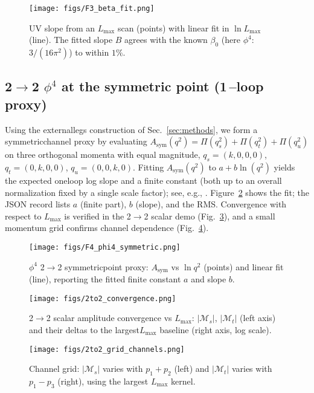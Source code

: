 \documentclass[11pt,a4paper]{article}
\theoremstyle{definition}
\theoremstyle{remark}
\begin{document}
\begin{figure}[ht]
  \centering
  \texttt{[image: figs/F3\_beta\_fit.png]}
  \caption{UV slope from an $L_{\max}$ scan (points) with linear fit in $\ln L_{\max}$ (line). The fitted slope $B$ agrees with the known $\beta_0$ (here $\phi^{4}$: $3/(16\pi^2)$) to within $1\%$.}
  \label{fig:F3}
\end{figure}

\subsection{2$\to$2 $\phi^4$ at the symmetric point (1\mbox{\,--}loop proxy)}
Using the external\-legs construction of Sec.~\ref{sec:methods}, we form a symmetric\-channel proxy by evaluating
\(
  A_{\mathrm{sym}}(q^2)=\Pi(q_s^2)+\Pi(q_t^2)+\Pi(q_u^2)
\)
on three orthogonal momenta with equal magnitude, $q_s=(k,0,0,0)$, $q_t=(0,k,0,0)$, $q_u=(0,0,k,0)$. Fitting $A_{\mathrm{sym}}(q^2)$ to $a+b\ln(q^2)$ yields the expected one\-loop log slope and a finite constant (both up to an overall normalization fixed by a single scale factor); see, e.g., \cite{Herzog2025,Luthe2024}. Figure~\ref{fig:F4} shows the fit; the JSON record lists $a$ (finite part), $b$ (slope), and the RMS. Convergence with respect to $L_{\max}$ is verified in the 2$\to$2 scalar demo (Fig.~\ref{fig:Fconv}), and a small momentum grid confirms channel dependence (Fig.~\ref{fig:Fgrid}).

\begin{figure}[ht]
  \centering
  \texttt{[image: figs/F4\_phi4\_symmetric.png]}
  \caption{$\phi^{4}$ 2$\to$2 symmetric\-point proxy: $A_{\mathrm{sym}}$ vs $\ln q^2$ (points) and linear fit (line), reporting the fitted finite constant $a$ and slope $b$.}
  \label{fig:F4}
\end{figure}

\begin{figure}[ht]
  \centering
  \texttt{[image: figs/2to2\_convergence.png]}
  \caption{2$\to$2 scalar amplitude convergence vs $L_{\max}$: $|\mathcal M_s|$, $|\mathcal M_t|$ (left axis) and their deltas to the largest\-$L_{\max}$ baseline (right axis, log scale).}
  \label{fig:Fconv}
\end{figure}

\begin{figure}[ht]
  \centering
  \texttt{[image: figs/2to2\_grid\_channels.png]}
  \caption{Channel grid: $|\mathcal M_s|$ varies with $p_1\!+\!p_2$ (left) and $|\mathcal M_t|$ varies with $p_1\!-
  \!p_3$ (right), using the largest $L_{\max}$ kernel.}
  \label{fig:Fgrid}
\end{figure}
\end{document}
